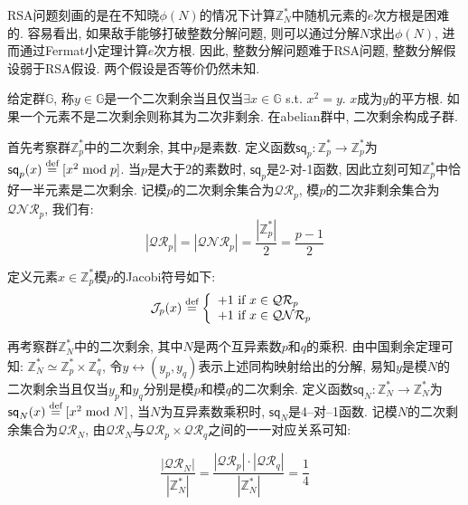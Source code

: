 \begin{remark}
RSA问题刻画的是在不知晓$\phi(N)$的情况下计算$\mathbb{Z}_N^*$中随机元素的$e$次方根是困难的. 
容易看出, 如果敌手能够打破整数分解问题, 则可以通过分解$N$求出$\phi(N)$, 进而通过Fermat小定理计算$e$次方根. 
因此, 整数分解问题难于RSA问题, 整数分解假设弱于RSA假设. 
两个假设是否等价仍然未知. 
\end{remark}

给定群$\mathbb{G}$, 称$y \in \mathbb{G}$是一个二次剩余当且仅当$\exists x \in \mathbb{G}$ s.t. $x^2 = y$. 
$x$成为$y$的平方根. 如果一个元素不是二次剩余则称其为二次非剩余. 
在abelian群中, 二次剩余构成子群.

首先考察群$\mathbb{Z}_p^*$中的二次剩余, 其中$p$是素数. 
定义函数$\mathsf{sq}_p: \mathbb{Z}_p^* \rightarrow \mathbb{Z}_p^*$为$\mathsf{sq}_p(x) \stackrel{\textup{def}}{=} [x^2 \bmod p]$. 
当$p$是大于2的素数时, $\mathsf{sq}_p$是2-对-1函数, 因此立刻可知$\mathbb{Z}_p^*$中恰好一半元素是二次剩余. 
记模$p$的二次剩余集合为$\mathcal{QR}_p$, 模$p$的二次非剩余集合为$\mathcal{QNR}_p$, 我们有: 
\begin{equation*}
|\mathcal{QR}_p| = |\mathcal{QNR}_p| = \frac{|\mathbb{Z}_p^*|}{2} = \frac{p-1}{2}
\end{equation*}

定义元素$x \in \mathbb{Z}_p^*$模$p$的Jacobi符号如下: 
\begin{displaymath}
\mathcal{J}_p(x) \stackrel{\textup{def}}{=}
\left\{
\begin{array}{l}
+1  \text{~if~} x \in \mathcal{QR}_p\\
+1 \text{~if~} x \in \mathcal{QNR}_p\\
\end{array}
\right.
\end{displaymath}

再考察群$\mathbb{Z}_N^*$中的二次剩余, 其中$N$是两个互异素数$p$和$q$的乘积. 
由中国剩余定理可知: $\mathbb{Z}_N^* \simeq \mathbb{Z}_p^* \times \mathbb{Z}_q^*$, 
令$y \leftrightarrow (y_p, y_q)$表示上述同构映射给出的分解, 易知$y$是模$N$的二次剩余当且仅当$y_p$和$y_q$分别是模$p$和模$q$的二次剩余. 
定义函数$\mathsf{sq}_N: \mathbb{Z}_N^* \rightarrow \mathbb{Z}_N^*$为$\mathsf{sq}_N(x) \stackrel{\textup{def}}{=} [x^2 \bmod N]$, 
当$N$为互异素数乘积时, $\mathsf{sq}_N$是4--对--1函数. 
记模$N$的二次剩余集合为$\mathcal{QR}_N$, 由$\mathcal{QR}_N$与$\mathcal{QR}_p \times \mathcal{QR}_q$之间的一一对应关系可知: 

\begin{equation*}
\frac{|\mathcal{QR}_N|}{|\mathbb{Z}_N^*|} = \frac{|\mathcal{QR}_p| \cdot |\mathcal{QR}_q|}{|\mathbb{Z}_N^*|} 
= \frac{1}{4}
\end{equation*}

